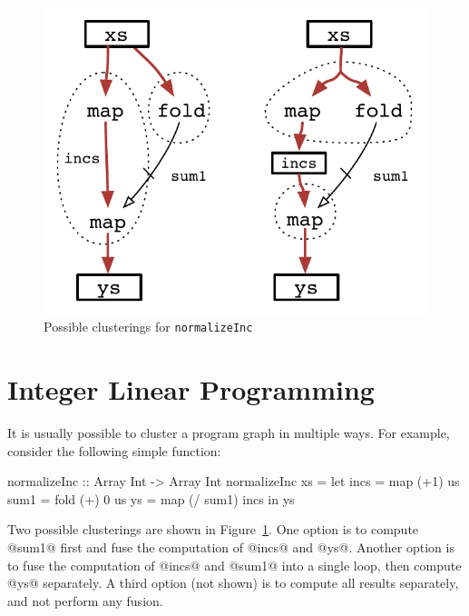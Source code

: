 
\begin{figure}
\begin{center}
\includegraphics[scale=0.5]{copy/03-body/clustering/figures/ex2-normalizeInc.pdf}
\end{center}
\caption{Possible clusterings for \texttt{normalizeInc}}
\label{clustering:f:normalizeInc}
\end{figure}


\section{Integer Linear Programming}
\label{clustering:s:ILP}
It is usually possible to cluster a program graph in multiple ways. For example, consider the following simple function:
\begin{code}
 normalizeInc :: Array Int -> Array Int
 normalizeInc xs
  = let incs = map  (+1)     us
        sum1 = fold (+) 0    us
        ys   = map  (/ sum1) incs
    in  ys
\end{code}

Two possible clusterings are shown in Figure~\ref{clustering:f:normalizeInc}. One option is to compute @sum1@ first and fuse the computation of @incs@ and @ys@. Another option is to fuse the computation of @incs@ and @sum1@ into a single loop, then compute @ys@ separately. A third option (not shown) is to compute all results separately, and not perform any fusion. 

